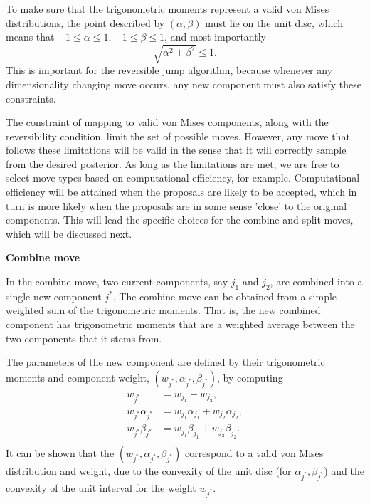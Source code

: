 To make sure that the trigonometric moments represent a valid von Mises distributions, the point described by $(\alpha, \beta)$ must lie on the unit disc, which means that $-1 \leq \alpha \leq 1$, $-1 \leq \beta \leq 1$, and most importantly
\begin{equation}
\label{eq:trigo-constraints}
\sqrt{\alpha^2 + \beta^2} \leq 1.
\end{equation}
This is important for the reversible jump algorithm, because whenever any dimensionality changing move occurs, any new component must also satisfy these constraints.

The constraint of mapping to valid von Mises components, along with the reversibility condition, limit the set of possible moves. However, any move that follows these limitations will be valid in the sense that it will correctly sample from the desired posterior. As long as the limitations are met, we are free to select move types based on computational efficiency, for example. Computational efficiency will be attained when the proposals are likely to be accepted, which in turn is more likely when the proposals are in some sense 'close' to the original components. This will lead the specific choices for the combine and split moves, which will be discussed next. 

\vspace{.4cm}

\textbf{Combine move}

In the combine move, two current components, say $j_1$ and $j_2$, are combined into a single new component $j^*$. The combine move can be obtained from a simple weighted sum of the trigonometric moments. That is, the new combined component has trigonometric moments that are a weighted average between the two components that it stems from.

The parameters of the new component are defined by their trigonometric moments and component weight, $(w_{j^*}, \alpha_{j^*}, \beta_{j^*})$, by computing
\begin{equation}
\label{eq:combine}
\begin{split}
w_{j^*} &= w_{j_1} + w_{j_2}, \\
w_{j^*} \alpha_{j^*} &= w_{j_1} \alpha_{j_1} + w_{j_2} \alpha_{j_2}, \\
w_{j^*} \beta_{j^*} &= w_{j_1} \beta_{j_1} + w_{j_2} \beta_{j_2}. \\
\end{split}
\end{equation}
It can be shown that the $(w_{j^*}, \alpha_{j^*}, \beta_{j^*})$ correspond to a valid von Mises distribution and weight, due to the convexity of the unit disc (for $\alpha_{j^*}, \beta_{j^*}$) and the convexity of the unit interval for the weight $w_{j^*}$.



